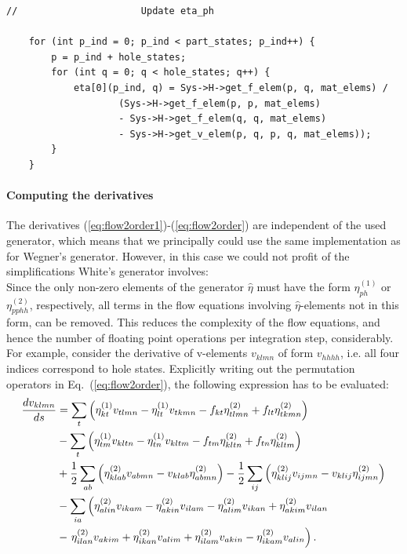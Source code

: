 \begin{lstlisting}[float, basicstyle=\footnotesize,caption={Straightforward implementation of the update of the one-body elements of $\hat{\eta}$, close to mathematical notation.},label={lst:white1}]
//                      Update eta_ph 
  
    for (int p_ind = 0; p_ind < part_states; p_ind++) {
        p = p_ind + hole_states;
        for (int q = 0; q < hole_states; q++) {
            eta[0](p_ind, q) = Sys->H->get_f_elem(p, q, mat_elems) /
                    (Sys->H->get_f_elem(p, p, mat_elems)
                    - Sys->H->get_f_elem(q, q, mat_elems)
                    - Sys->H->get_v_elem(p, q, p, q, mat_elems));
        }
    }
\end{lstlisting}

\paragraph{Computing the derivatives}
The derivatives (\ref{eq:flow2order1})-(\ref{eq:flow2order}) are independent of the used generator, which means that we principally could use the same implementation as for Wegner's generator. However, in this case we could not profit of the simplifications White's generator involves:\\
Since the only non-zero elements of the generator $\hat{\eta}$ must have the form $\eta_{ph}^{(1)}$ or $\eta_{pphh}^{(2)}$, respectively, all terms in the flow equations involving $\hat{\eta}$-elements not in this form, can be removed. This reduces the complexity of the flow equations, and hence the number of floating point operations per integration step, considerably.\\
For example, consider the derivative of v-elements $v_{klmn}$ of form $v_{hhhh}$, i.e. all four indices correspond to hole states. Explicitly writing out the permutation operators in Eq.~(\ref{eq:flow2order}), the following expression has to be evaluated:
\begin{align}
\frac{d v_{klmn}}{ds} &= \sum_t  \lb \eta_{kt}^{(1)}v_{tlmn}- \eta_{lt}^{(1)}v_{tkmn}-f_{kt}\eta_{tlmn}^{(2)} + f_{lt}\eta_{tkmn}^{(2)}\rb \notag \\
& - \sum_t \lb \eta_{tm}^{(1)} v_{kltn}- \eta_{tn}^{(1)} v_{kltm}- f_{tm} \eta_{kltn}^{(2)} + f_{tn} \eta_{kltm}^{(2)}\rb \notag \\
& +\frac{1}{2}\sum_{ab} \lb\eta_{klab}^{(2)} v_{abmn} - v_{klab}\eta_{abmn}^{(2)}\rb - 
\frac{1}{2}\sum_{ij} \lb\eta_{klij}^{(2)} v_{ijmn} - v_{klij}\eta_{ijmn}^{(2)}\rb \notag \\
& -\sum_{ia} \lb \eta_{alin}^{(2)}v_{ikam} - \eta_{akin}^{(2)}v_{ilam} - \eta_{alim}^{(2)}v_{ikan} + \eta_{akim}^{(2)}v_{ilan} \right. \notag \\
& -\left. \eta_{ilan}^{(2)}v_{akim} + \eta_{ikan}^{(2)}v_{alim} +\eta_{ilam}^{(2)}v_{akin} - \eta_{ikam}^{(2)}v_{alin}\rb .
\label{eq:vWhite}
\end{align}

